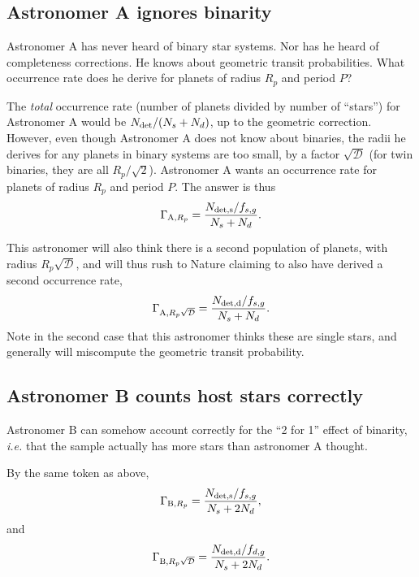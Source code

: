\documentclass{emulateapj}
\begin{document}
\subsection{Astronomer A ignores binarity}
Astronomer A has never heard of binary star systems. 
Nor has he heard of completeness corrections.
He knows about geometric transit probabilities.
What occurrence rate does he derive for planets of radius $R_p$ and period $P$?

The {\it total} occurrence rate (number of planets divided by number of 
``stars'') for Astronomer A would be $N_{\rm det}/(N_s + N_d)$, up to the 
geometric correction. 
However, even though Astronomer A does not know about binaries, the radii he 
derives for any planets in binary systems are too small, by a factor 
$\sqrt{\mathcal{D}}$ (for twin binaries, they are all $R_p/\sqrt{2}$).
Astronomer A wants an occurrence rate for planets of radius $R_p$ and period 
$P$.
The answer is thus
\begin{equation}
\Gamma_{{\rm A}, R_p} = \frac{N_{\rm det,s}/f_{s,g}}{N_s + N_d}.
\end{equation}

This astronomer will also think there is a second population of planets, with 
radius $R_p \sqrt{\mathcal{D}}$, and will thus rush to Nature claiming to also
have derived a second occurrence rate,
\begin{equation}
\Gamma_{{\rm A}, R_p \sqrt{\mathcal{D}}} = \frac{N_{\rm det,d}/f_{s,g}}{N_s 
+ N_d}.
\end{equation}
Note in the second case that this astronomer thinks these are single stars, and 
generally will miscompute the geometric transit probability.


\subsection{Astronomer B counts host stars correctly}
Astronomer B can somehow account correctly for the ``2 for 1'' 
effect of binarity, \textit{i.e.} that the sample actually has more stars than 
astronomer A thought.

By the same token as above,
\begin{equation}
\Gamma_{{\rm B},R_p} = \frac{N_{\rm det,s}/f_{s,g}}{N_s + 2N_d},
\end{equation}
and
\begin{equation}
\Gamma_{{\rm B},R_p \sqrt{\mathcal{D}}} = 
		\frac{N_{\rm det,d}/f_{d,g}}{N_s + 2N_d}.
\end{equation}
\end{document}
